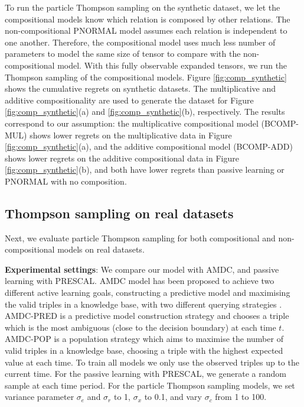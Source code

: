 To run the particle Thompson sampling on the synthetic dataset, we let the 
compositional models know which relation is composed by other relations. 
The non-compositional PNORMAL model assumes each relation is independent to one another. 
Therefore, the compositional model uses much less number of parameters to model 
the same size of tensor to compare with the non-compositional model. 
With this fully observable expanded tensors, we run the Thompson sampling of 
the compositional models.
Figure \ref{fig:comp_synthetic} shows the cumulative regrets on synthetic 
datasets. The multiplicative and additive compositionality are used to 
generate the dataset for Figure \ref{fig:comp_synthetic}(a) and 
\ref{fig:comp_synthetic}(b), respectively. The results correspond to our 
assumption: the multiplicative compositional model (BCOMP-MUL) shows lower 
regrets on the multiplicative data in Figure \ref{fig:comp_synthetic}(a), and 
the additive compositional model (BCOMP-ADD) shows lower regrets on the 
additive compositional data in Figure \ref{fig:comp_synthetic}(b), 
and both have lower regrets than passive learning or PNORMAL with no composition. 

\subsection{Thompson sampling on real datasets}

Next, we evaluate particle Thompson sampling for both compositional and non-compositional models on real datasets.

\textbf{Experimental settings}: 
We compare our model with AMDC, and passive learning with PRESCAL.  
AMDC model has been proposed to achieve two different active learning goals, constructing a predictive
model and maximising the valid triples in a knowledge base, with two different querying strategies
 \cite{kajino2015active}. 
AMDC-PRED is a predictive model construction strategy and chooses a triple which is the most ambiguous (close to the decision boundary) at each time $t$.
AMDC-POP is a population strategy which aims to maximise the number of valid triples in a knowledge base, choosing a triple with the highest expected value at each time.  
To train all models we only use the observed triples up to the current time. For the passive learning with PRESCAL, we generate a random sample at each time period. For the particle Thompson sampling models, we set variance parameter $\sigma_e$ and $\sigma_r$ to 1, $\sigma_x$ to 0.1, and vary $\sigma_c$ from 1 to 100.

